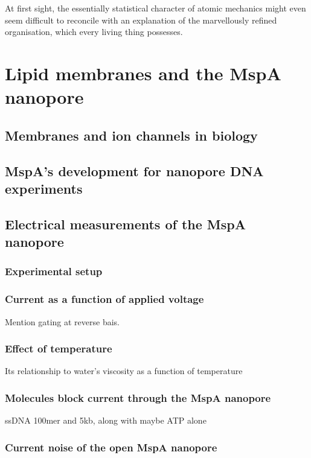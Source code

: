 \begin{savequote}[75mm]
At first sight, the essentially statistical character of atomic mechanics might even seem difficult to reconcile with an explanation of the marvellously refined organisation, which every living thing possesses.
\end{savequote}

\chapter{Lipid membranes and the MspA nanopore}
\label{lipids_mspa}

\section{Membranes and ion channels in biology}

\section{MspA's development for nanopore DNA experiments}

\section{Electrical measurements of the MspA nanopore}

\subsection{Experimental setup}

\subsection{Current as a function of applied voltage}

Mention gating at reverse bais.

\subsection{Effect of temperature}

Its relationship to water's viscosity as a function of temperature

\subsection{Molecules block current through the MspA nanopore}

ssDNA 100mer and 5kb, along with maybe ATP alone

\subsection{Current noise of the open MspA nanopore}